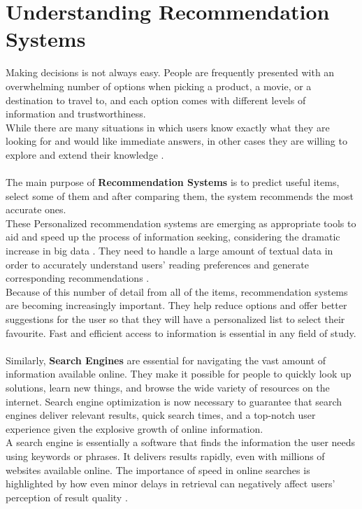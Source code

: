 \documentclass[\myFontSize,oneside,english,hidelinks,a4paper]{article}
\begin{document}
\section{Understanding Recommendation Systems}
Making decisions is not always easy. People are frequently presented with an overwhelming number of options when picking a product, a movie, or a destination to travel to, and each option comes with different levels of information and trustworthiness. \\
While there are many situations in which users know exactly what they are looking for and would like immediate answers, in other cases they are willing to explore and extend their knowledge \cite{Blanco201333}.\\\\
The main purpose of \textbf{Recommendation Systems} is to predict useful items, select some of them and after comparing them, the system recommends the most accurate ones.\\ 
These Personalized recommendation systems are emerging as appropriate tools to aid and speed up the process of information seeking, considering the dramatic increase in big data \cite{Haruna2017}. They need to handle a large amount of textual data in order to accurately understand users’ reading preferences and generate corresponding recommendations \cite{Yan2024}. \\
%
Because of this number of detail from all of the items, recommendation systems are becoming increasingly important. They help reduce options and offer better suggestions for the user so that they will have a personalized list to select their favourite. Fast and efficient access to information is essential in any field of study. \\\\
%
Similarly, \textbf{Search Engines} are essential for navigating the vast amount of information available online. They make it possible for people to quickly look up solutions, learn new things, and browse the wide variety of resources on the internet. Search engine optimization is now necessary to guarantee that search engines deliver relevant results, quick search times, and a top-notch user experience given the explosive growth of online information.\\
A search engine is essentially a software that finds the information the user needs using keywords or phrases. It delivers results rapidly, even with millions of websites available online.
The importance of speed in online searches is highlighted by how even minor delays in retrieval can negatively affect users' perception of result quality \cite{pub.1171882357}.\\
\end{document}
